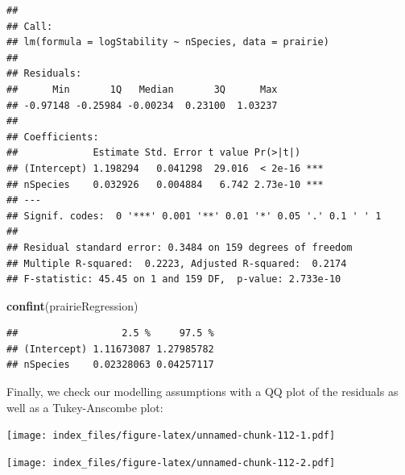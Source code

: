 \documentclass[]{article}
\newenvironment{Shaded}{\begin{snugshade}}{\end{snugshade}}
\newcommand{\DataTypeTok}[1]{\textcolor[rgb]{0.13,0.29,0.53}{#1}}
\newcommand{\KeywordTok}[1]{\textcolor[rgb]{0.13,0.29,0.53}{\textbf{#1}}}
\newcommand{\NormalTok}[1]{#1}
\newcommand{\OperatorTok}[1]{\textcolor[rgb]{0.81,0.36,0.00}{\textbf{#1}}}
\newcommand{\StringTok}[1]{\textcolor[rgb]{0.31,0.60,0.02}{#1}}
\begin{document}
\begin{verbatim}
## 
## Call:
## lm(formula = logStability ~ nSpecies, data = prairie)
## 
## Residuals:
##      Min       1Q   Median       3Q      Max 
## -0.97148 -0.25984 -0.00234  0.23100  1.03237 
## 
## Coefficients:
##             Estimate Std. Error t value Pr(>|t|)    
## (Intercept) 1.198294   0.041298  29.016  < 2e-16 ***
## nSpecies    0.032926   0.004884   6.742 2.73e-10 ***
## ---
## Signif. codes:  0 '***' 0.001 '**' 0.01 '*' 0.05 '.' 0.1 ' ' 1
## 
## Residual standard error: 0.3484 on 159 degrees of freedom
## Multiple R-squared:  0.2223, Adjusted R-squared:  0.2174 
## F-statistic: 45.45 on 1 and 159 DF,  p-value: 2.733e-10
\end{verbatim}

\begin{Shaded}
\begin{Highlighting}[]
\KeywordTok{confint}\NormalTok{(prairieRegression)}
\end{Highlighting}
\end{Shaded}

\begin{verbatim}
##                  2.5 %     97.5 %
## (Intercept) 1.11673087 1.27985782
## nSpecies    0.02328063 0.04257117
\end{verbatim}

Finally, we check our modelling assumptions with a QQ plot of the
residuals as well as a Tukey-Anscombe plot:

\begin{Shaded}
\end{Shaded}

\texttt{[image: index\_files/figure-latex/unnamed-chunk-112-1.pdf]}

\begin{Shaded}
\end{Shaded}

\texttt{[image: index\_files/figure-latex/unnamed-chunk-112-2.pdf]}
\end{document}
